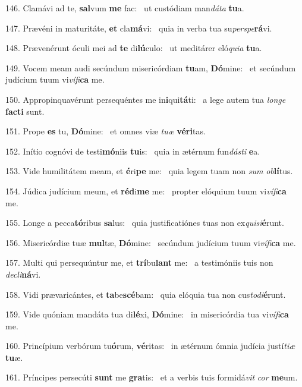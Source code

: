 146. Clamávi ad te, \textbf{sal}vum \textbf{me} fac: \ast\  ut custódiam man\textit{dá}\textit{ta} \textbf{tu}a.\

147. Prævéni in maturitáte, \textbf{et} cla\textbf{má}vi: \ast\  quia in verba tua su\textit{per}\textit{spe}\textbf{rá}vi.\

148. Prævenérunt óculi mei ad \textbf{te} di\textbf{lú}culo: \ast\  ut meditárer eló\textit{qui}\textit{a} \textbf{tu}a.\

149. Vocem meam audi secúndum misericórdiam \textbf{tu}am, \textbf{Dó}mine: \ast\  et secúndum judícium tuum vi\textit{ví}\textit{fi}\textbf{ca} me.\

150. Appropinquavérunt persequéntes me in\textbf{i}qui\textbf{tá}ti: \ast\  a lege autem tua \textit{lon}\textit{ge} \textbf{fac}\textbf{ti} sunt.\

151. Prope \textbf{es} tu, \textbf{Dó}mine: \ast\  et omnes viæ \textit{tu}\textit{æ} \textbf{vé}\textbf{ri}tas.\

152. Inítio cognóvi de testi\textbf{mó}niis \textbf{tu}is: \ast\  quia in ætérnum fun\textit{dás}\textit{ti} \textbf{e}a.\

153. Vide humilitátem meam, et \textbf{é}ri\textbf{pe} me: \ast\  quia legem tuam non \textit{sum} \textit{ob}\textbf{lí}tus.\

154. Júdica judícium meum, et \textbf{réd}i\textbf{me} me: \ast\  propter elóquium tuum vi\textit{ví}\textit{fi}\textbf{ca} me.\

155. Longe a pecca\textbf{tó}ribus \textbf{sa}lus: \ast\  quia justificatiónes tuas non ex\textit{qui}\textit{si}\textbf{é}runt.\

156. Misericórdiæ tuæ \textbf{mul}tæ, \textbf{Dó}mine: \ast\  secúndum judícium tuum vi\textit{ví}\textit{fi}\textbf{ca} me.\

157. Multi qui persequúntur me, et \textbf{trí}bu\textbf{lant} me: \ast\  a testimóniis tuis non \textit{de}\textit{cli}\textbf{ná}vi.\

158. Vidi prævaricántes, et \textbf{ta}be\textbf{scé}bam: \ast\  quia elóquia tua non cus\textit{to}\textit{di}\textbf{é}runt.\

159. Vide quóniam mandáta tua di\textbf{lé}xi, \textbf{Dó}mine: \ast\  in misericórdia tua vi\textit{ví}\textit{fi}\textbf{ca} me.\

160. Princípium verbórum tu\textbf{ó}rum, \textbf{vé}ritas: \ast\  in ætérnum ómnia judícia justí\textit{ti}\textit{æ} \textbf{tu}æ.\

161. Príncipes persecúti \textbf{sunt} me \textbf{gra}tis: \ast\  et a verbis tuis formidá\textit{vit} \textit{cor} \textbf{me}um.\

